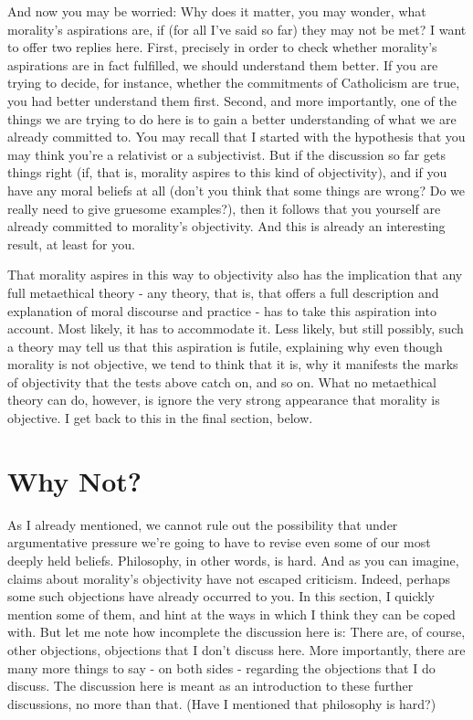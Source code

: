And now you may be worried: Why does it matter, you may wonder, what 
morality's aspirations are, if (for all I’ve said so far) they may not be met? I want to offer 
two replies here. First, precisely in order to check whether morality’s aspirations are in 
fact fulfilled, we should understand them better. If you are trying to decide, for instance, 
whether the commitments of Catholicism are true, you had better understand them 
first. Second, and more importantly, one of the things we are trying to do here is to gain 
a better understanding of what we are already committed to. You may recall that I 
started with the hypothesis that you may think you're a relativist or a subjectivist. But if 
the discussion so far gets things right (if, that is, morality aspires to this kind of 
objectivity), and if you have any moral beliefs at all (don't you think that some things are 
wrong? Do we really need to give gruesome examples?), then it follows that you 
yourself are already committed to morality's objectivity. And this is already an 
interesting result, at least for you. 

That morality aspires in this way to objectivity also has the implication that any 
full metaethical theory - any theory, that is, that offers a full description and explanation 
of moral discourse and practice - has to take this aspiration into account. Most likely, it 
has to accommodate it. Less likely, but still possibly, such a theory may tell us that this 
aspiration is futile, explaining why even though morality is not objective, we tend to 
think that it is, why it manifests the marks of objectivity that the tests above catch on, 
and so on. What no metaethical theory can do, however, is ignore the very strong 
appearance that morality is objective. I get back to this in the final section, below. 

\section{Why Not?}

As I already mentioned, we cannot rule out the possibility that under argumentative 
pressure we're going to have to revise even some of our most deeply held beliefs. 
Philosophy, in other words, is hard. And as you can imagine, claims about morality's 
objectivity have not escaped criticism. Indeed, perhaps some such objections have 
already occurred to you. In this section, I quickly mention some of them, and hint at the 
ways in which I think they can be coped with. But let me note how incomplete the 
discussion here is: There are, of course, other objections, objections that I don't discuss 
here. More importantly, there are many more things to say - on both sides - regarding 
the objections that I do discuss. The discussion here is meant as an introduction to these 
further discussions, no more than that. (Have I mentioned that philosophy is hard?) 
 
